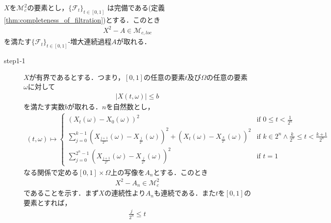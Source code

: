 	\begin{screen}
		\begin{thm}[局所マルチンゲールの二乗過程は増大過程と局所マルチンゲールに分解できる]
		\label{thm:decomposition_of_local_martingales}
			$X$を$\mathscr{M}_{c}^{2}$の要素とし，$\{\mathscr{F}_{t}\}_{t \in [0,1]}$
			は完備である(定義\ref{thm:completeness_of_filtration})とする．このとき
			\begin{align}
				X^{2} - A \in \mathscr{M}_{c,loc}
			\end{align}
			を満たす$\{\mathscr{F}_{t}\}_{t \in [0,1]}$-増大連続過程$A$が取れる．
		\end{thm}
	\end{screen}
	
	\begin{sketch}\mbox{}
		\begin{description}
			\item[step1-1] $X$が有界であるとする．つまり，$[0,1]$の任意の要素$t$及び$\Omega$の任意の要素$\omega$に対して
				\begin{align}
					|X(t,\omega)| \leq b
				\end{align}
				を満たす実数$b$が取れる．$n$を自然数とし，
				\begin{align}
					(t,\omega) \longmapsto 
					\begin{cases}
						\left( X_{t}(\omega) - X_{0}(\omega) \right)^{2} 
						&\mbox{if } {\displaystyle 0 \leq t < \frac{1}{2^{n}}} \\
						{\displaystyle \sum_{j=0}^{k-1} \left( X_{\frac{j+1}{2^{n}}}(\omega) - X_{\frac{j}{2^{n}}}(\omega) \right)^{2}
						+ \left( X_{t}(\omega) - X_{\frac{k}{2^{n}}}(\omega) \right)^{2}}
						&\mbox{if } {\displaystyle k \in 2^{n} \wedge \frac{k}{2^{n}} \leq t < \frac{k+1}{2^{n}}} \\
						{\displaystyle \sum_{j=0}^{2^{n}-1} \left( X_{\frac{j+1}{2^{n}}}(\omega) - X_{\frac{j}{2^{n}}}(\omega) \right)^{2}}
						&\mbox{if } t = 1
					\end{cases}
				\end{align}
				なる関係で定める$[0,1] \times \Omega$上の写像を$A_{n}$とする．このとき
				\begin{align}
					X^2 - A_{n} \in \mathscr{M}_{c}^{2}
					\label{fom:thm_decomposition_of_square_integrable_martingales_2}
				\end{align}
				であることを示す．まず$X$の連続性より$A_{n}$も連続である．また$t$を$[0,1]$の要素とすれば，
				\begin{align}
					\frac{j}{2^{n}} \leq t
				\end{align}

\end{description}
\end{sketch}
